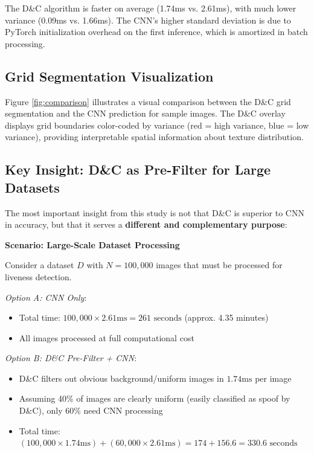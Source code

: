 \documentclass[conference]{IEEEtran}
\begin{document}
The D\&C algorithm is faster on average (1.74ms vs. 2.61ms), with much lower variance (0.09ms vs. 1.66ms). The CNN's higher standard deviation is due to PyTorch initialization overhead on the first inference, which is amortized in batch processing.

\subsection{Grid Segmentation Visualization}

Figure \ref{fig:comparison} illustrates a visual comparison between the D\&C grid segmentation and the CNN prediction for sample images. The D\&C overlay displays grid boundaries color-coded by variance (red = high variance, blue = low variance), providing interpretable spatial information about texture distribution.

\subsection{Key Insight: D\&C as Pre-Filter for Large Datasets}

The most important insight from this study is not that D\&C is superior to CNN in accuracy, but that it serves a \textbf{different and complementary purpose}:

\textbf{Scenario: Large-Scale Dataset Processing}

Consider a dataset $D$ with $N = 100,000$ images that must be processed for liveness detection.

\textit{Option A: CNN Only}:
\begin{itemize}
    \item Total time: $100,000 \times 2.61\text{ms} = 261\text{ seconds}$ (approx. 4.35 minutes)
    \item All images processed at full computational cost
\end{itemize}

\textit{Option B: D\&C Pre-Filter + CNN}:
\begin{itemize}
    \item D\&C filters out obvious background/uniform images in $1.74\text{ms}$ per image
    \item Assuming 40\% of images are clearly uniform (easily classified as spoof by D\&C), only 60\% need CNN processing
    \item Total time: $(100,000 \times 1.74\text{ms}) + (60,000 \times 2.61\text{ms}) = 174 + 156.6 = 330.6\text{ seconds}$
\end{itemize}
\end{document}
